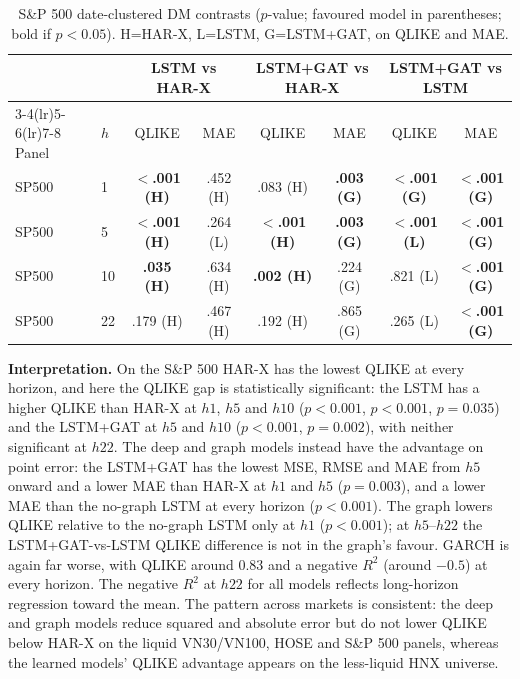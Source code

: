 \documentclass[runningheads]{llncs}
\begin{document}
\begin{table}[t]
\centering
\caption{S\&P 500 date-clustered DM contrasts ($p$-value; favoured model in parentheses; bold if $p<0.05$).
H=HAR-X, L=LSTM, G=LSTM+GAT, on QLIKE and MAE.}
\label{tab:dmsp500}
\footnotesize
\setlength{\tabcolsep}{4pt}
\begin{tabular}{ll cc cc cc}
\toprule
& & \multicolumn{2}{c}{LSTM vs HAR-X} & \multicolumn{2}{c}{LSTM+GAT vs HAR-X} & \multicolumn{2}{c}{LSTM+GAT vs LSTM} \\
\cmidrule(lr){3-4}\cmidrule(lr){5-6}\cmidrule(lr){7-8}
Panel & $h$ & QLIKE & MAE & QLIKE & MAE & QLIKE & MAE \\
\midrule
SP500 & 1  & \textbf{$<$.001 (H)} & .452 (H) & .083 (H) & \textbf{.003 (G)} & \textbf{$<$.001 (G)} & \textbf{$<$.001 (G)} \\
SP500 & 5  & \textbf{$<$.001 (H)} & .264 (L) & \textbf{$<$.001 (H)} & \textbf{.003 (G)} & \textbf{$<$.001 (L)} & \textbf{$<$.001 (G)} \\
SP500 & 10 & \textbf{.035 (H)} & .634 (H) & \textbf{.002 (H)} & .224 (G) & .821 (L) & \textbf{$<$.001 (G)} \\
SP500 & 22 & .179 (H) & .467 (H) & .192 (H) & .865 (G) & .265 (L) & \textbf{$<$.001 (G)} \\
\bottomrule
\end{tabular}
\end{table}

\textbf{Interpretation.} On the S\&P 500 HAR-X has the lowest QLIKE at every horizon, and here the QLIKE gap is
statistically significant: the LSTM has a higher QLIKE than HAR-X at $h1$, $h5$ and $h10$ ($p<0.001$,
$p<0.001$, $p=0.035$) and the LSTM+GAT at $h5$ and $h10$ ($p<0.001$, $p=0.002$), with neither significant at
$h22$. The deep and graph models instead have the advantage on point error: the LSTM+GAT has the lowest MSE,
RMSE and MAE from $h5$ onward and a lower MAE than HAR-X at $h1$ and $h5$ ($p=0.003$), and a lower MAE than the
no-graph LSTM at every horizon ($p<0.001$). The graph lowers QLIKE relative to the no-graph LSTM only at $h1$
($p<0.001$); at $h5$--$h22$ the LSTM+GAT-vs-LSTM QLIKE difference is not in the graph's favour. GARCH is again
far worse, with QLIKE around $0.83$ and a negative $R^2$ (around $-0.5$) at every horizon. The negative $R^2$ at $h22$ for
all models reflects long-horizon regression toward the mean. The pattern across markets is consistent: the deep
and graph models reduce squared and absolute error but do not lower QLIKE below HAR-X on the liquid VN30/VN100,
HOSE and S\&P 500 panels, whereas the learned models' QLIKE advantage appears on the less-liquid HNX universe.
\end{document}
